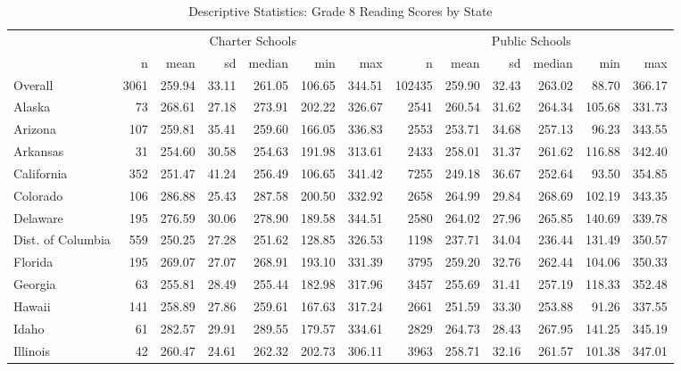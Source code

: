 \begin{sidewaystable}[htb]
\begin{center}
\caption{Descriptive Statistics: Grade 8 Reading Scores by State}
\label{g8readingdesc}
{\smaller
\begin{tabular}{lrrrrrr@{\extracolsep{10pt}}rrrrrr}
  \hline & \multicolumn{6}{c}{Charter Schools} & \multicolumn{6}{c}{Public Schools} \\ \cline{2-7} \cline{8-13} & n & mean & sd & median & min & max & n & mean & sd & median & min & max \\ 
  \hline
Overall & 3061 & 259.94 & 33.11 & 261.05 & 106.65 & 344.51 & 102435 & 259.90 & 32.43 & 263.02 & 88.70 & 366.17 \\ 
  Alaska &  73 & 268.61 & 27.18 & 273.91 & 202.22 & 326.67 & 2541 & 260.54 & 31.62 & 264.34 & 105.68 & 331.73 \\ 
  Arizona & 107 & 259.81 & 35.41 & 259.60 & 166.05 & 336.83 & 2553 & 253.71 & 34.68 & 257.13 & 96.23 & 343.55 \\ 
  Arkansas &  31 & 254.60 & 30.58 & 254.63 & 191.98 & 313.61 & 2433 & 258.01 & 31.37 & 261.62 & 116.88 & 342.40 \\ 
  California & 352 & 251.47 & 41.24 & 256.49 & 106.65 & 341.42 & 7255 & 249.18 & 36.67 & 252.64 & 93.50 & 354.85 \\ 
  Colorado & 106 & 286.88 & 25.43 & 287.58 & 200.50 & 332.92 & 2658 & 264.99 & 29.84 & 268.69 & 102.19 & 343.35 \\ 
  Delaware & 195 & 276.59 & 30.06 & 278.90 & 189.58 & 344.51 & 2580 & 264.02 & 27.96 & 265.85 & 140.69 & 339.78 \\ 
  Dist. of Columbia & 559 & 250.25 & 27.28 & 251.62 & 128.85 & 326.53 & 1198 & 237.71 & 34.04 & 236.44 & 131.49 & 350.57 \\ 
  Florida & 195 & 269.07 & 27.07 & 268.91 & 193.10 & 331.39 & 3795 & 259.20 & 32.76 & 262.44 & 104.06 & 350.33 \\ 
  Georgia &  63 & 255.81 & 28.49 & 255.44 & 182.98 & 317.96 & 3457 & 255.69 & 31.41 & 257.19 & 118.33 & 352.48 \\ 
  Hawaii & 141 & 258.89 & 27.86 & 259.61 & 167.63 & 317.24 & 2661 & 251.59 & 33.30 & 253.88 & 91.26 & 337.55 \\ 
  Idaho &  61 & 282.57 & 29.91 & 289.55 & 179.57 & 334.61 & 2829 & 264.73 & 28.43 & 267.95 & 141.25 & 345.19 \\ 
  Illinois &  42 & 260.47 & 24.61 & 262.32 & 202.73 & 306.11 & 3963 & 258.71 & 32.16 & 261.57 & 101.38 & 347.01 \\ 

\end{tabular}}
\end{center}
\end{sidewaystable}
